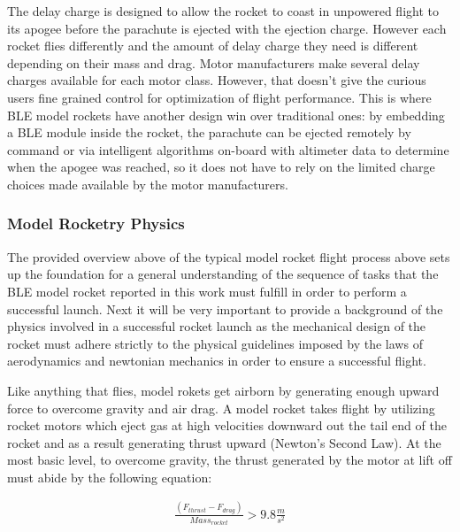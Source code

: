 \documentclass{workreport}
\begin{document}
\begin{body}
	The delay charge is designed to allow the rocket to coast in unpowered flight to its apogee before the parachute is ejected with the ejection charge. However each rocket flies differently and the amount of delay charge they need is different depending on their mass and drag. Motor manufacturers make several delay charges available for each motor class. However, that doesn't give the curious users fine grained control for optimization of flight performance. This is where BLE model rockets have another design win over traditional ones: by embedding a BLE module inside the rocket, the parachute can be ejected remotely by command or via intelligent algorithms on-board with altimeter data to determine when the apogee was reached, so it does not have to rely on the limited charge choices made available by the motor manufacturers.

\subsubsection{Model Rocketry Physics}

	The provided overview above of the typical model rocket flight process above sets up the foundation for a general understanding of the sequence of tasks that the BLE model rocket reported in this work must fulfill in order to perform a successful launch. Next it will be very important to provide a background of the physics involved in a successful rocket launch as the mechanical design of the rocket must adhere strictly to the physical guidelines imposed by the laws of aerodynamics and newtonian mechanics in order to ensure a successful flight.

	Like anything that flies, model rokets get airborn by generating enough upward force to overcome gravity and air drag. A model rocket takes flight by utilizing rocket motors which eject gas at high velocities downward out the tail end of the rocket and as a result generating thrust upward (Newton's Second Law). At the most basic level, to overcome gravity, the thrust generated by the motor at lift off must abide by the following equation:

	\begin{align}
		\frac{(F_{thrust} - F_{drag})}{Mass_{rocket}} > 9.8 \frac{m}{s^2}
	\end{align}


\end{body}
\end{document}
